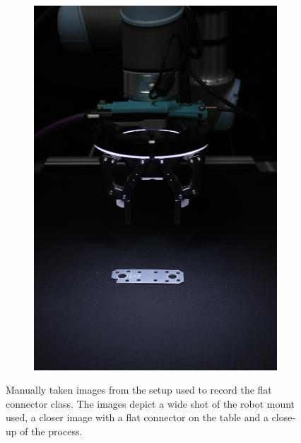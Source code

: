 \begin{figure}[htbp]
\begin{subfigure}[b]{0.3\textwidth}
    \end{subfigure}
    \begin{subfigure}[b]{0.3\textwidth}
        \centering
        \includegraphics[angle=90, width=\textwidth]{figures/setupimages/setup_close.JPG}


    \end{subfigure}
    \caption{Manually taken images from the setup used to record the flat connector class. The images depict a wide shot of the robot mount used, 
             a closer image with a flat connector on the table and a close-up of the process.}
    \label{fig:setupofdatacollection}
\end{figure}

